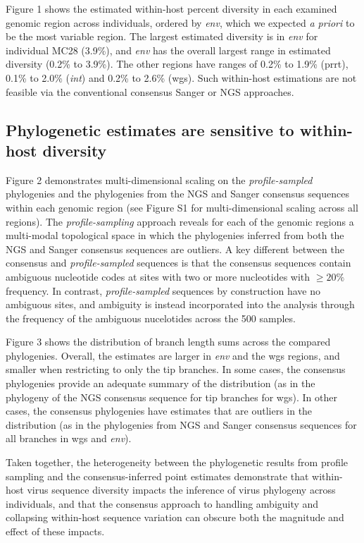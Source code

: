 \documentclass[letterpaper]{article}
\begin{document}
Figure 1 shows the estimated within-host percent diversity in each examined genomic region across individuals, ordered by \emph{env}, which we expected \emph{a priori} to be the most variable region. The largest estimated diversity is in \emph{env} for individual MC28 (3.9\%), and \emph{env} has the overall largest range in estimated diversity (0.2\% to 3.9\%). The other regions have ranges of 0.2\% to 1.9\% (prrt), 0.1\% to 2.0\% (\emph{int}) and 0.2\% to 2.6\% (wgs). Such within-host estimations are not feasible via the conventional consensus Sanger or NGS approaches.

\subsection*{Phylogenetic estimates are sensitive to within-host diversity}

Figure 2 demonstrates multi-dimensional scaling on the \emph{profile-sampled} phylogenies and the phylogenies from the NGS and Sanger consensus sequences within each genomic region (see Figure S1 for multi-dimensional scaling across all regions). The \emph{profile-sampling} approach reveals for each of the genomic regions a multi-modal topological space in which the phylogenies inferred from both the NGS and Sanger consensus sequences are outliers. A key different between the consensus and \emph{profile-sampled} sequences is that the consensus sequences contain ambiguous nucleotide codes at sites with two or more nucleotides with $\geq 20\%$ frequency. In contrast, \emph{profile-sampled} sequences by construction have no ambiguous sites, and ambiguity is instead incorporated into the analysis through the frequency of the ambiguous nucelotides across the 500 samples.

Figure 3 shows the distribution of branch length sums across the compared phylogenies. Overall, the estimates are larger in \emph{env} and the wgs regions, and smaller when restricting to only the tip branches. In some cases, the consensus phylogenies provide an adequate summary of the distribution (as in the phylogeny of the NGS consensus sequence for tip branches for wgs). In other cases, the consensus phylogenies have estimates that are outliers in the distribution (as in the phylogenies from NGS and Sanger consensus sequences for all branches in wgs and \emph{env}).

Taken together, the heterogeneity between the phylogenetic results from profile sampling and the consensus-inferred point estimates demonstrate that within-host virus sequence diversity impacts the inference of virus phylogeny across individuals, and that the consensus approach to handling ambiguity and collapsing within-host sequence variation can obscure both the magnitude and effect of these impacts.
\end{document}
